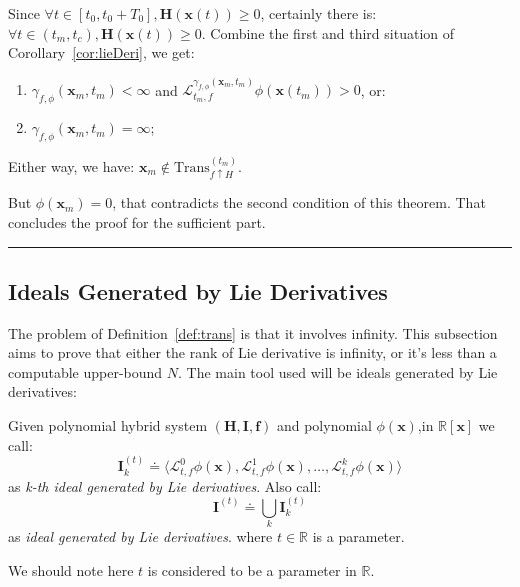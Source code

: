 \documentclass{jssc}
\newcommand{\rulex}{\hfill\rule{1mm}{3mm}}
\begin{document}
Since $\forall t \in [t_0, t_0 + T_0], \boldsymbol{H}(\boldsymbol{x}(t)) \geq 0$, certainly there is: $\forall t \in (t_m, t_c),\boldsymbol{H}(\boldsymbol{x}(t)) \geq 0$. Combine the first and third situation of Corollary~\ref{cor:lieDeri}, we get:
\begin{enumerate}
	\item $\gamma_{f, \phi}(\boldsymbol{x}_m, t_m) < \infty$ and $\mathcal{L}_{t_m, f}^{\gamma_{f, \phi}(\boldsymbol{x}_m, t_m)} \phi (\boldsymbol{x}(t_m)) > 0$, or:
	\item $\gamma_{f, \phi}(\boldsymbol{x}_m, t_m) = \infty$;
\end{enumerate}
Either way, we have: $\boldsymbol{x}_m \notin \mathrm{Trans}_{f \uparrow H}^{(t_m)}$.

But $\phi(\boldsymbol{x}_m) = 0$, that contradicts the second condition of this theorem. That concludes the proof for the sufficient part.
\rulex \newline

\subsection{Ideals Generated by Lie Derivatives}
\label{sub:original}
The problem of Definition~\ref{def:trans} is that it involves infinity. This subsection aims to prove that either the rank of Lie derivative is infinity, or it's less than a computable upper-bound $N$. The main tool used will be ideals generated by Lie derivatives:

\begin{definition}
\label{def:lieIdeal}
Given polynomial hybrid system $(\boldsymbol{H}, \boldsymbol{I}, \boldsymbol{f})$ and polynomial $\phi(\boldsymbol{x})$,in $\mathbb{R}[\boldsymbol{x}]$ we call:
		\begin{equation*}
			\boldsymbol{I}_k^{(t)} \doteq \langle \mathcal{L}_{t, f}^0 \phi(\boldsymbol{x}), \mathcal{L}_{t, f}^1 \phi(\boldsymbol{x}), \dots, \mathcal{L}_{t, f}^k \phi(\boldsymbol{x}) \rangle
		\end{equation*}
		as \emph{k-th ideal generated by Lie derivatives}. Also call:
		\begin{equation*}
			\boldsymbol{I}^{(t)} \doteq \bigcup_k \boldsymbol{I}_k^{(t)}
		\end{equation*}
		as \emph{ideal generated by Lie derivatives}. where $t \in \mathbb{R}$ is a parameter.
\end{definition}
We should note here $t$ is considered to be a parameter in $\mathbb{R}$.
\end{document}
